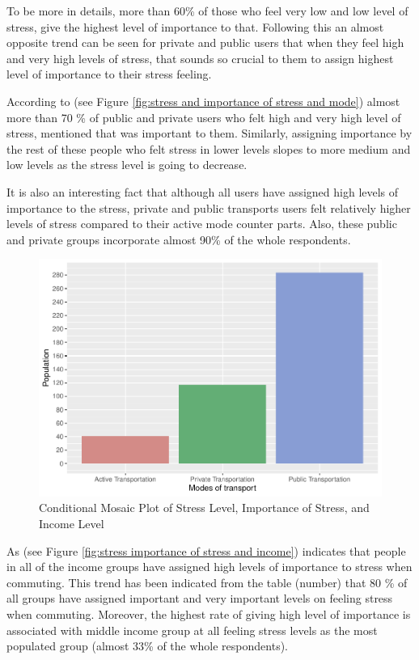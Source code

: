 \documentclass[
11pt, %
oneside, %
english, %
singlespacing, %
]{macthesis} %
\begin{document}
To be more in details, more than 60\% of those who feel very low and low level of stress, give the highest level of importance to that. Following this an almost opposite trend can be seen for private and public users that when they feel high and very high levels of stress, that sounds so crucial to them to assign highest level of importance to their stress feeling.

According to (see Figure \ref{fig:stress and importance of stress and mode}) almost more than 70 \% of public and private users who felt high and very high level of stress, mentioned that was important to them. Similarly, assigning importance by the rest of these people who felt stress in lower levels slopes to more medium and low levels as the stress level is going to decrease.

It is also an interesting fact that although all users have assigned high levels of importance to the stress, private and public transports users felt relatively higher levels of stress compared to their active mode counter parts. Also, these public and private groups incorporate almost 90\% of the whole respondents.
\begin{figure}
\includegraphics[width=0.85\linewidth]{thesis_files/figure-latex/unnamed-chunk-24-1} \caption{\label{fig:stress importance of stress and income}Conditional Mosaic Plot of Stress Level, Importance of Stress, and Income Level}\label{fig:unnamed-chunk-24}
\end{figure}
As (see Figure \ref{fig:stress importance of stress and income}) indicates that people in all of the income groups have assigned high levels of importance to stress when commuting. This trend has been indicated from the table (number) that 80 \% of all groups have assigned important and very important levels on feeling stress when commuting. Moreover, the highest rate of giving high level of importance is associated with middle income group at all feeling stress levels as the most populated group (almost 33\% of the whole respondents).
\end{document}
